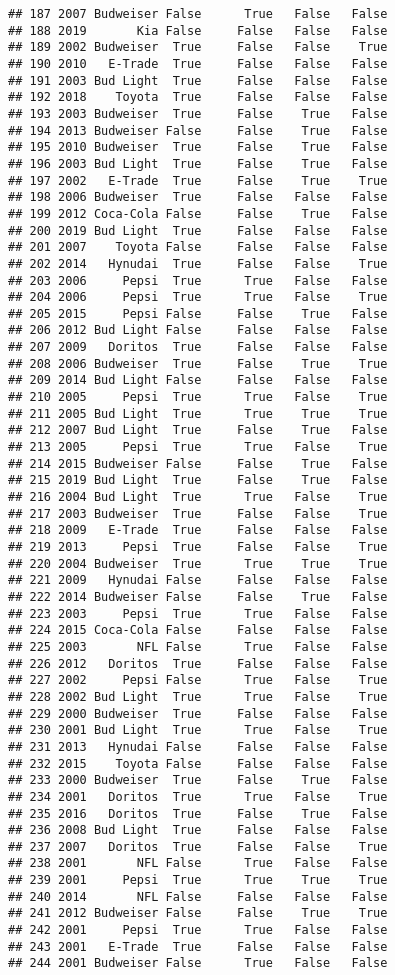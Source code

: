 \documentclass[
]{article}
\begin{document}
\begin{verbatim}
## 187 2007 Budweiser False      True   False   False
## 188 2019       Kia False     False   False   False
## 189 2002 Budweiser  True     False   False    True
## 190 2010   E-Trade  True     False   False   False
## 191 2003 Bud Light  True     False   False   False
## 192 2018    Toyota  True     False   False   False
## 193 2003 Budweiser  True     False    True   False
## 194 2013 Budweiser False     False    True   False
## 195 2010 Budweiser  True     False    True   False
## 196 2003 Bud Light  True     False    True   False
## 197 2002   E-Trade  True     False    True    True
## 198 2006 Budweiser  True     False   False   False
## 199 2012 Coca-Cola False     False    True   False
## 200 2019 Bud Light  True     False   False   False
## 201 2007    Toyota False     False   False   False
## 202 2014   Hynudai  True     False   False    True
## 203 2006     Pepsi  True      True   False   False
## 204 2006     Pepsi  True      True   False    True
## 205 2015     Pepsi False     False    True   False
## 206 2012 Bud Light False     False   False   False
## 207 2009   Doritos  True     False   False   False
## 208 2006 Budweiser  True     False    True    True
## 209 2014 Bud Light False     False   False   False
## 210 2005     Pepsi  True      True   False    True
## 211 2005 Bud Light  True      True    True    True
## 212 2007 Bud Light  True     False    True   False
## 213 2005     Pepsi  True      True   False    True
## 214 2015 Budweiser False     False    True   False
## 215 2019 Bud Light  True     False    True   False
## 216 2004 Bud Light  True      True   False    True
## 217 2003 Budweiser  True     False   False    True
## 218 2009   E-Trade  True     False   False   False
## 219 2013     Pepsi  True     False   False    True
## 220 2004 Budweiser  True      True    True    True
## 221 2009   Hynudai False     False   False   False
## 222 2014 Budweiser False     False    True   False
## 223 2003     Pepsi  True      True   False   False
## 224 2015 Coca-Cola False     False   False   False
## 225 2003       NFL False      True   False   False
## 226 2012   Doritos  True     False   False   False
## 227 2002     Pepsi False      True   False    True
## 228 2002 Bud Light  True      True   False    True
## 229 2000 Budweiser  True     False   False   False
## 230 2001 Bud Light  True      True   False    True
## 231 2013   Hynudai False     False   False   False
## 232 2015    Toyota False     False   False   False
## 233 2000 Budweiser  True     False    True   False
## 234 2001   Doritos  True      True   False    True
## 235 2016   Doritos  True     False    True   False
## 236 2008 Bud Light  True     False   False   False
## 237 2007   Doritos  True     False   False    True
## 238 2001       NFL False      True   False   False
## 239 2001     Pepsi  True      True    True    True
## 240 2014       NFL False     False   False   False
## 241 2012 Budweiser False     False    True    True
## 242 2001     Pepsi  True      True   False   False
## 243 2001   E-Trade  True     False   False   False
## 244 2001 Budweiser False      True   False   False
\end{verbatim}
\end{document}
